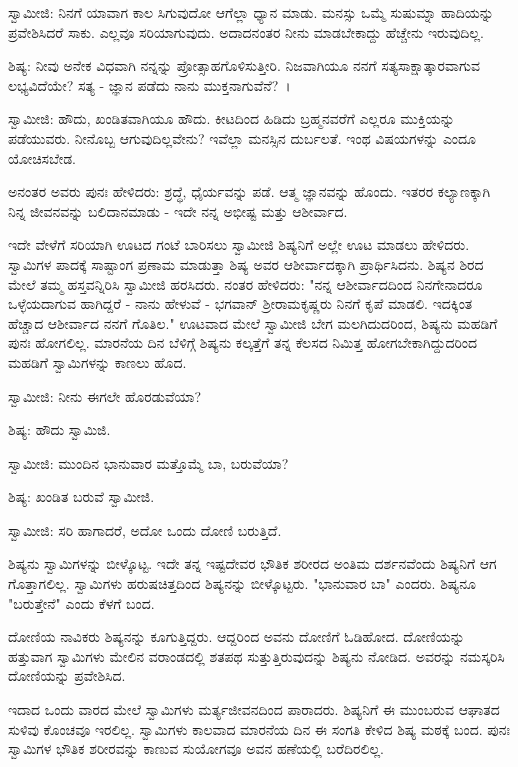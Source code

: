 ಸ್ವಾಮೀಜಿ: ನಿನಗೆ ಯಾವಾಗ ಕಾಲ ಸಿಗುವುದೋ ಆಗೆಲ್ಲಾ ಧ್ಯಾನ ಮಾಡು. ಮನಸ್ಸು ಒಮ್ಮೆ ಸುಷುಮ್ನಾ ಹಾದಿಯನ್ನು ಪ್ರವೇಶಿಸಿದರೆ ಸಾಕು. ಎಲ್ಲವೂ ಸರಿಯಾಗುವುದು. ಅದಾದನಂತರ ನೀನು ಮಾಡಬೇಕಾದ್ದು ಹೆಚ್ಚೇನು ಇರುವುದಿಲ್ಲ.

ಶಿಷ್ಯ: ನೀವು ಅನೇಕ ವಿಧವಾಗಿ ನನ್ನನ್ನು ಪ್ರೋತ್ಸಾಹಗೊಳಿಸುತ್ತೀರಿ. ನಿಜವಾಗಿಯೂ ನನಗೆ ಸತ್ಯಸಾಕ್ಷಾತ್ಕಾರವಾಗುವ ಲಭ್ಯವಿದೆಯೇ? ಸತ್ಯ - ಜ್ಞಾನ ಪಡೆದು ನಾನು ಮುಕ್ತನಾಗುವೆನೆ?~।

ಸ್ವಾಮೀಜಿ: ಹೌದು, ಖಂಡಿತವಾಗಿಯೂ ಹೌದು. ಕೀಟದಿಂದ ಹಿಡಿದು ಬ್ರಹ್ಮನವರೆಗೆ ಎಲ್ಲರೂ ಮುಕ್ತಿಯನ್ನು ಪಡೆಯುವರು. ನೀನೊಬ್ಬ ಆಗುವುದಿಲ್ಲವೇನು? ಇವೆಲ್ಲಾ ಮನಸ್ಸಿನ ದುರ್ಬಲತೆ. ಇಂಥ ವಿಷಯಗಳನ್ನು ಎಂದೂ ಯೋಚಿಸಬೇಡ.

ಅನಂತರ ಅವರು ಪುನಃ ಹೇಳಿದರು: ಶ್ರದ್ಧೆ, ಧೈರ್ಯವನ್ನು ಪಡೆ. ಆತ್ಮ ಜ್ಞಾನವನ್ನು ಹೊಂದು. ಇತರರ ಕಲ್ಯಾಣಕ್ಕಾಗಿ ನಿನ್ನ ಜೀವನವನ್ನು ಬಲಿದಾನಮಾಡು - ಇದೇ ನನ್ನ ಅಭೀಷ್ಟ ಮತ್ತು ಆಶೀರ್ವಾದ.

ಇದೇ ವೇಳೆಗೆ ಸರಿಯಾಗಿ ಊಟದ ಗಂಟೆ ಬಾರಿಸಲು ಸ್ವಾಮೀಜಿ ಶಿಷ್ಯನಿಗೆ ಅಲ್ಲೇ ಊಟ ಮಾಡಲು ಹೇಳಿದರು. ಸ್ವಾಮಿಗಳ ಪಾದಕ್ಕೆ ಸಾಷ್ಟಾಂಗ ಪ್ರಣಾಮ ಮಾಡುತ್ತಾ ಶಿಷ್ಯ ಅವರ ಆಶೀರ್ವಾದಕ್ಕಾಗಿ ಪ್ರಾರ್ಥಿಸಿದನು. ಶಿಷ್ಯನ ಶಿರದ ಮೇಲೆ ತಮ್ಮ ಹಸ್ತವನ್ನಿರಿಸಿ ಸ್ವಾಮೀಜಿ ಹರಸಿದರು. ನಂತರ ಹೇಳಿದರು: "ನನ್ನ ಆಶೀರ್ವಾದದಿಂದ ನಿನಗೇನಾದರೂ ಒಳ್ಳೆಯದಾಗುವ ಹಾಗಿದ್ದರೆ - ನಾನು ಹೇಳುವೆ - ಭಗವಾನ್ ಶ‍್ರೀರಾಮಕೃಷ್ಣರು ನಿನಗೆ ಕೃಪೆ ಮಾಡಲಿ. ಇದಕ್ಕಿಂತ ಹೆಚ್ಚಾದ ಆಶೀರ್ವಾದ ನನಗೆ ಗೊತಿಲ." ಊಟವಾದ ಮೇಲೆ ಸ್ವಾಮೀಜಿ ಬೇಗ ಮಲಗಿದುದರಿಂದ, ಶಿಷ್ಯನು ಮಹಡಿಗೆ ಪುನಃ ಹೋಗಲಿಲ್ಲ. ಮಾರನೆಯ ದಿನ ಬೆಳಿಗ್ಗೆ ಶಿಷ್ಯನು ಕಲ್ಕತ್ತೆಗೆ ತನ್ನ ಕೆಲಸದ ನಿಮಿತ್ತ ಹೋಗಬೇಕಾಗಿದ್ದುದರಿಂದ ಮಹಡಿಗೆ ಸ್ವಾಮಿಗಳನ್ನು ಕಾಣಲು ಹೊದ.

ಸ್ವಾಮೀಜಿ: ನೀನು ಈಗಲೇ ಹೊರಡುವೆಯಾ?

ಶಿಷ್ಯ: ಹೌದು ಸ್ವಾಮಿಜಿ.

ಸ್ವಾಮೀಜಿ: ಮುಂದಿನ ಭಾನುವಾರ ಮತ್ತೊಮ್ಮೆ ಬಾ, ಬರುವೆಯಾ?

ಶಿಷ್ಯ: ಖಂಡಿತ ಬರುವೆ ಸ್ವಾಮೀಜಿ.

ಸ್ವಾಮೀಜಿ: ಸರಿ ಹಾಗಾದರೆ, ಅದೋ ಒಂದು ದೋಣಿ ಬರುತ್ತಿದೆ.

ಶಿಷ್ಯನು ಸ್ವಾಮಿಗಳನ್ನು ಬೀಳ್ಕೊಟ್ಟ. ಇದೇ ತನ್ನ ಇಷ್ಟದೇವರ ಭೌತಿಕ ಶರೀರದ ಅಂತಿಮ ದರ್ಶನವೆಂದು ಶಿಷ್ಯನಿಗೆ ಆಗ ಗೊತ್ತಾಗಲಿಲ್ಲ. ಸ್ವಾಮಿಗಳು ಹರುಷಚಿತ್ತದಿಂದ ಶಿಷ್ಯನನ್ನು ಬೀಳ್ಕೊಟ್ಟರು. "ಭಾನುವಾರ ಬಾ" ಎಂದರು. ಶಿಷ್ಯನೂ "ಬರುತ್ತೇನೆ" ಎಂದು ಕೆಳಗೆ ಬಂದ.

ದೋಣಿಯ ನಾವಿಕರು ಶಿಷ್ಯನನ್ನು ಕೂಗುತ್ತಿದ್ದರು. ಆದ್ದರಿಂದ ಅವನು ದೋಣಿಗೆ ಓಡಿಹೋದ. ದೋಣಿಯನ್ನು ಹತ್ತುವಾಗ ಸ್ವಾಮಿಗಳು ಮೇಲಿನ ವರಾಂಡದಲ್ಲಿ ಶತಪಥ ಸುತ್ತುತ್ತಿರುವುದನ್ನು ಶಿಷ್ಯನು ನೋಡಿದ. ಅವರನ್ನು ನಮಸ್ಕರಿಸಿ ದೋಣಿಯನ್ನು ಪ್ರವೇಶಿಸಿದ.

ಇದಾದ ಒಂದು ವಾರದ ಮೇಲೆ ಸ್ವಾಮಿಗಳು ಮರ್ತ್ಯಜೀವನದಿಂದ ಪಾರಾದರು. ಶಿಷ್ಯನಿಗೆ ಈ ಮುಂಬರುವ ಆಘಾತದ ಸುಳಿವು ಕೊಂಚವೂ ಇರಲಿಲ್ಲ. ಸ್ವಾಮಿಗಳು ಕಾಲವಾದ ಮಾರನೆಯ ದಿನ ಈ ಸಂಗತಿ ಕೇಳಿದ ಶಿಷ್ಯ ಮಠಕ್ಕೆ ಬಂದ. ಪುನಃ ಸ್ವಾಮಿಗಳ ಭೌತಿಕ ಶರೀರವನ್ನು ಕಾಣುವ ಸುಯೋಗವೂ ಅವನ ಹಣೆಯಲ್ಲಿ ಬರೆದಿರಲಿಲ್ಲ.

